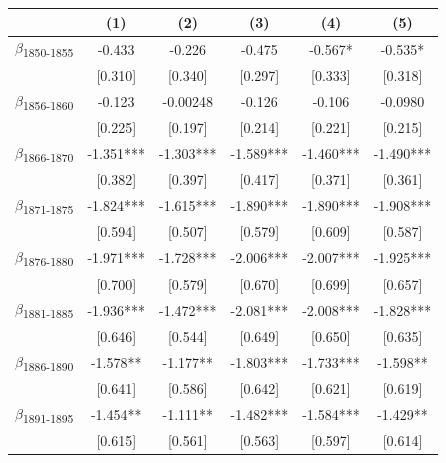 {
\def\sym#1{\ifmmode^{#1}\else\(^{#1}\)\fi}
\begin{tabular}{l*{5}{c}}
\toprule
            &\multicolumn{1}{c}{(1)}   &\multicolumn{1}{c}{(2)}   &\multicolumn{1}{c}{(3)}   &\multicolumn{1}{c}{(4)}   &\multicolumn{1}{c}{(5)}   \\
\midrule
$\beta$\textsubscript{1850-1855}&      -0.433   &      -0.226   &      -0.475   &      -0.567*  &      -0.535*  \\
            &     [0.310]   &     [0.340]   &     [0.297]   &     [0.333]   &     [0.318]   \\
$\beta$\textsubscript{1856-1860}&      -0.123   &    -0.00248   &      -0.126   &      -0.106   &     -0.0980   \\
            &     [0.225]   &     [0.197]   &     [0.214]   &     [0.221]   &     [0.215]   \\
$\beta$\textsubscript{1866-1870}&      -1.351***&      -1.303***&      -1.589***&      -1.460***&      -1.490***\\
            &     [0.382]   &     [0.397]   &     [0.417]   &     [0.371]   &     [0.361]   \\
$\beta$\textsubscript{1871-1875}&      -1.824***&      -1.615***&      -1.890***&      -1.890***&      -1.908***\\
            &     [0.594]   &     [0.507]   &     [0.579]   &     [0.609]   &     [0.587]   \\
$\beta$\textsubscript{1876-1880}&      -1.971***&      -1.728***&      -2.006***&      -2.007***&      -1.925***\\
            &     [0.700]   &     [0.579]   &     [0.670]   &     [0.699]   &     [0.657]   \\
$\beta$\textsubscript{1881-1885}&      -1.936***&      -1.472***&      -2.081***&      -2.008***&      -1.828***\\
            &     [0.646]   &     [0.544]   &     [0.649]   &     [0.650]   &     [0.635]   \\
$\beta$\textsubscript{1886-1890}&      -1.578** &      -1.177** &      -1.803***&      -1.733***&      -1.598** \\
            &     [0.641]   &     [0.586]   &     [0.642]   &     [0.621]   &     [0.619]   \\
$\beta$\textsubscript{1891-1895}&      -1.454** &      -1.111** &      -1.482***&      -1.584***&      -1.429** \\
            &     [0.615]   &     [0.561]   &     [0.563]   &     [0.597]   &     [0.614]   \\

\end{tabular}}

